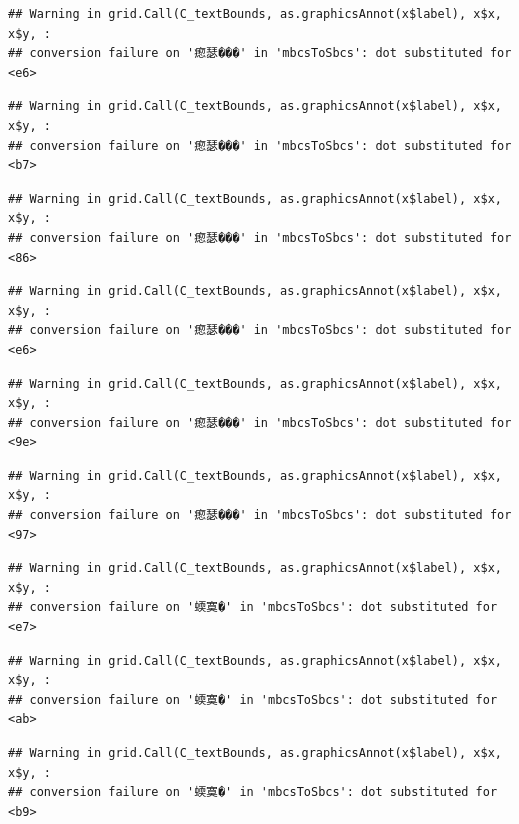 \documentclass[
]{article}
\begin{document}
\begin{verbatim}
## Warning in grid.Call(C_textBounds, as.graphicsAnnot(x$label), x$x, x$y, :
## conversion failure on '瘛瑟���' in 'mbcsToSbcs': dot substituted for <e6>
\end{verbatim}

\begin{verbatim}
## Warning in grid.Call(C_textBounds, as.graphicsAnnot(x$label), x$x, x$y, :
## conversion failure on '瘛瑟���' in 'mbcsToSbcs': dot substituted for <b7>
\end{verbatim}

\begin{verbatim}
## Warning in grid.Call(C_textBounds, as.graphicsAnnot(x$label), x$x, x$y, :
## conversion failure on '瘛瑟���' in 'mbcsToSbcs': dot substituted for <86>
\end{verbatim}

\begin{verbatim}
## Warning in grid.Call(C_textBounds, as.graphicsAnnot(x$label), x$x, x$y, :
## conversion failure on '瘛瑟���' in 'mbcsToSbcs': dot substituted for <e6>
\end{verbatim}

\begin{verbatim}
## Warning in grid.Call(C_textBounds, as.graphicsAnnot(x$label), x$x, x$y, :
## conversion failure on '瘛瑟���' in 'mbcsToSbcs': dot substituted for <9e>
\end{verbatim}

\begin{verbatim}
## Warning in grid.Call(C_textBounds, as.graphicsAnnot(x$label), x$x, x$y, :
## conversion failure on '瘛瑟���' in 'mbcsToSbcs': dot substituted for <97>
\end{verbatim}

\begin{verbatim}
## Warning in grid.Call(C_textBounds, as.graphicsAnnot(x$label), x$x, x$y, :
## conversion failure on '蝡寞�' in 'mbcsToSbcs': dot substituted for <e7>
\end{verbatim}

\begin{verbatim}
## Warning in grid.Call(C_textBounds, as.graphicsAnnot(x$label), x$x, x$y, :
## conversion failure on '蝡寞�' in 'mbcsToSbcs': dot substituted for <ab>
\end{verbatim}

\begin{verbatim}
## Warning in grid.Call(C_textBounds, as.graphicsAnnot(x$label), x$x, x$y, :
## conversion failure on '蝡寞�' in 'mbcsToSbcs': dot substituted for <b9>
\end{verbatim}
\end{document}
